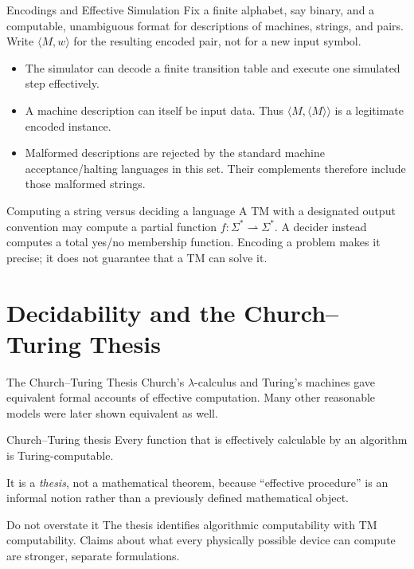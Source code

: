 \documentclass[10pt]{beamer}
\begin{document}
\begin{frame}{Encodings and Effective Simulation}
  \small
  Fix a finite alphabet, say binary, and a computable, unambiguous format
  for descriptions of machines, strings, and pairs. Write $\langle M,w\rangle$
  for the resulting encoded pair, not for a new input symbol.
  \begin{itemize}
    \item The simulator can decode a finite transition table and execute
      one simulated step effectively.
    \item A machine description can itself be input data. Thus
      $\langle M,\langle M\rangle\rangle$ is a legitimate encoded instance.
    \item Malformed descriptions are rejected by the standard machine
      acceptance/halting languages in this set. Their complements therefore
      include those malformed strings.
  \end{itemize}
  \begin{block}{Computing a string versus deciding a language}
    A TM with a designated output convention may compute a partial function
    $f:\Sigma^*\rightharpoonup\Sigma^*$. A decider instead computes a total
    yes/no membership function. Encoding a problem makes it precise;
    it does not guarantee that a TM can solve it.
  \end{block}
\end{frame}

\section{Decidability and the Church--Turing Thesis}

\begin{frame}{The Church--Turing Thesis}
  Church's $\lambda$-calculus and Turing's machines gave equivalent formal accounts of effective
  computation. Many other reasonable models were later shown equivalent as well.
  \begin{block}{Church--Turing thesis}
    Every function that is effectively calculable by an algorithm is Turing-computable.
  \end{block}
  It is a \emph{thesis}, not a mathematical theorem, because ``effective procedure'' is an informal
  notion rather than a previously defined mathematical object.
  \begin{alertblock}{Do not overstate it}
    The thesis identifies algorithmic computability with TM computability. Claims about what every
    physically possible device can compute are stronger, separate formulations.
  \end{alertblock}
\end{frame}
\end{document}
